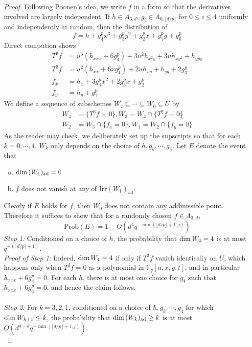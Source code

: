 \documentclass[12pt]{article}
\theoremstyle{plain}
\theoremstyle{definition}
\newcommand{\IF}{\mathbb{F}}
\renewcommand\dim{{\rm dim\,}}
\newcommand{\<}{\langle}
\renewcommand{\>}{\rangle}
\newcommand{\Prob}{\mathrm{Prob}}
\newcommand{\ad}{\mathrm{ad}}
\newcommand{\yk}{\lfloor d/p \rfloor}
\newcommand{\Irr}{\mathrm{Irr}}
\begin{document}
\begin{proof}
Following Poonen's idea, we write $f$ in a form so that the derivatives involved are largely independent. If $h \in A_{3, d}$, $g_i \in A_{0, \yk}$ for $0 \le i \le 4$ uniformly and independently at random, then the distribution of 
$$ f = h + g_4^p x^3  + g_3^p y^2 + g_2^p x + g_1^p y + g_0^p  $$ 
Direct compution shows 
\begin{align*}
T^3 f &= u^3(h_{xxx} + 6 g_4^p) + 3 u^2 h_{x^2 y} + 3 u h_{xy^2} + h_{yyy} \\
T^2 f &= u^2(h_{xx} + 6x g_4^p) + 2 u h_{xy} + h_{yy} + 2 g_3^p \\
f_x &= h_x + 3 g_4^p x^2 + 2 g_3^p x + g_2^p \\
f_y &= h_y + g_1^p
\end{align*}
We define a sequence of subschemes $W_4 \subseteq \cdots \subseteq W_0 \subseteq U$ by 
\begin{align*}
W_4 &= \{ T^3 f = 0 \}, W_3 = W_4 \cap \{ T^2 f = 0 \} \\
W_2 &= W_3 \cap \{ f_x = 0 \}, W_1 = W_2 \cap \{ f_y = 0 \}
\end{align*}
As the reader may check, we deliberately set up the supscripts so that for each $k = 0,\cdots, 4$, $W_k$ only depends on the choice of $h, g_{k}, \cdots, g_4$. Let $E$ denote the event that 
\begin{enumerate}[a.]
\item $\dim (W_1)_\ad = 0$
\item $f$ does not vanish at any of $\Irr (W_1)_\ad$. 
\end{enumerate} 
Clearly if $E$ holds for $f$, then $W_0$ does not contain any addmissible point. Therefore it suffices to show that for a randomly chosen $f \in A_{3, d}$,
$$ \Prob(E) = 1 - O(d^4 q^{- \min(\yk + 1, j)})$$
\textit{Step 1:} Conditioned on a choice of $h$, the probability that $\dim W_4 = 4$ is at most $q^{-(\yk + 1)}$. \\
\textit{Proof of Step 1: }Indeed, $\dim W_4 = 4$ if only if $T^3 f$ vanish identically on $U$, which happens only when $T^3 f = 0$ as a polynomial in $\IF_q[u, x, y, t]$, and in particular $h_{xxx} + 6 g_4^p = 0$. For each $h$, there is at most one choice for $g_4$ such that $h_{xxx} + 6 g_4^p = 0$, and hence the claim follows. \\\\
\textit{Step 2:} For $k = 3, 2, 1$, conditioned on a choice of $h, g_k, \cdots, g_4$ for which $\dim W_{k + 1} \le k$, the probability that $\dim (W_k)_\ad \ge k$ is at most $O(d^{4 - k} q^{- \min(\yk + 1, j)})$.\\

\end{proof}
\end{document}
